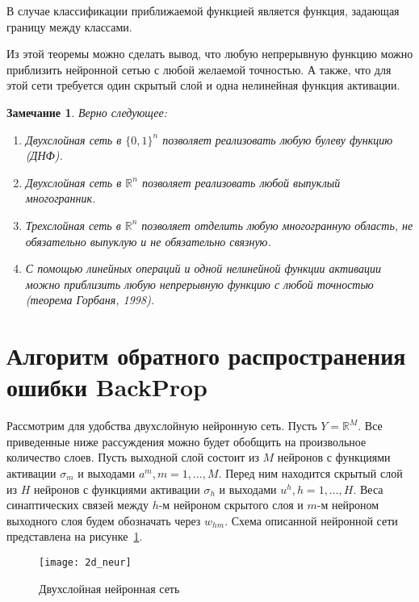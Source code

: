 \documentclass{article}
\newtheorem{remark}{Замечание}
\begin{document}
	В случае классификации приближаемой функцией является функция, задающая границу между классами.
	
	Из этой теоремы можно сделать вывод, что любую непрерывную функцию можно приблизить нейронной сетью с любой желаемой точностью. А также, что для этой сети требуется один скрытый слой и одна нелинейная функция активации. 
	
	\begin{remark}
		Верно следующее:
		\begin{enumerate} 
			\item Двухслойная сеть в $\{0,1\}^n$ позволяет реализовать любую булеву функцию (ДНФ). 
			\item Двухслойная сеть в $\mathbb{R}^n$ позволяет реализовать любой выпуклый многогранник. 
			\item Трехслойная сеть в $\mathbb{R}^n$ позволяет отделить любую многогранную область, не обязательно выпуклую и не обязательно связную. 
			\item С помощью линейных операций и одной нелинейной функции активации можно приблизить любую непрерывную функцию с любой точностью (теорема Горбаня, 1998). 
		\end{enumerate}
	\end{remark}
	
	\section{Алгоритм обратного распространения ошибки BackProp}
	
	Рассмотрим для удобства двухслойную нейронную сеть. Пусть $Y = \mathbb{R}^M$. Все приведенные ниже рассуждения можно будет обобщить на произвольное количество слоев. Пусть выходной слой состоит из $M$ нейронов с функциями активации $\sigma_m$ и выходами $a^m, m = 1,\ldots,M$. Перед ним находится скрытый слой из $H$ нейронов с функциями активации $\sigma_h$ и выходами $u^h, h = 1, \ldots,H$. Веса синаптических связей между $h$-м нейроном скрытого слоя и $m$-м нейроном выходного слоя будем обозначать через $w_{hm}$. Схема описанной нейронной сети представлена на рисунке~\ref{neuralnetwork}.
	
	\begin{figure}[H]
		\begin{center}
			\begin{minipage}{0.85\linewidth}
				\texttt{[image: 2d\_neur]}
				\caption{Двухслойная нейронная сеть}
				\label{neuralnetwork}
			\end{minipage}
		\end{center}
	\end{figure}
	
\end{document}
